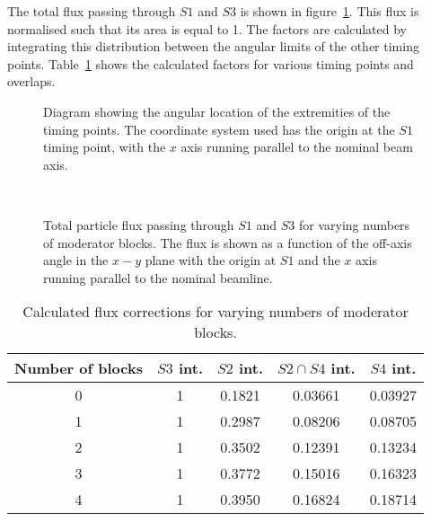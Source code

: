 \begin{figure}[h]
  
\end{figure}

The total flux passing through $\mathit{S1}$ and $\mathit{S3}$ is shown in figure~\ref{fig:s1s3all}.
This flux is normalised such that its area is equal to 1.
The factors are calculated by integrating this distribution between the angular limits of the other timing points.
Table~\ref{tab:fluxFactors} shows the calculated factors for various timing points and overlaps.

\begin{figure}[h]
  \begin{minipage}{0.49\textwidth}
    \begin{adjustbox}{max totalsize={\textwidth}{.5\textheight}}
      
    \end{adjustbox}
    \centering
    \caption{Diagram showing the angular location of the extremities of the timing points. The coordinate system used has the origin at the $\mathit{S1}$ timing point, with the $x$ axis running parallel to the nominal beam axis.}
    \label{fig:beamAng}
  \end{minipage}
  \hfill
  \begin{minipage}{0.49\textwidth}
    \begin{adjustbox}{max totalsize={\textwidth}{0.5\textheight}, center}
      
    \end{adjustbox}
    \caption{Total particle flux passing through $\mathit{S1}$ and $\mathit{S3}$ for varying numbers of moderator blocks. The flux is shown as a function of the off-axis angle in the $x-y$ plane with the origin at $\mathit{S1}$ and the $x$ axis running parallel to the nominal beamline.}
    \label{fig:s1s3all}
  \end{minipage}
  \
\end{figure}

\begin{table}
  \centering
  \begin{tabular}{|c|c|c|c|c|}
    \hline
    Number of blocks & $\mathit{S3}$ int. & $\mathit{S2}$ int. & $\mathit{S2} \cap \mathit{S4}$ int. & $\mathit{S4}$ int. \\
    \hline
    0 & 1 & 0.1821 & 0.03661 & 0.03927 \\
    1 & 1 & 0.2987 & 0.08206 & 0.08705 \\
    2 & 1 & 0.3502 & 0.12391 & 0.13234 \\
    3 & 1 & 0.3772 & 0.15016 & 0.16323 \\
    4 & 1 & 0.3950 & 0.16824 & 0.18714 \\
    \hline		
  \end{tabular}
  \caption{Calculated flux corrections for varying numbers of moderator blocks.}
  \label{tab:fluxFactors}
\end{table}
    
